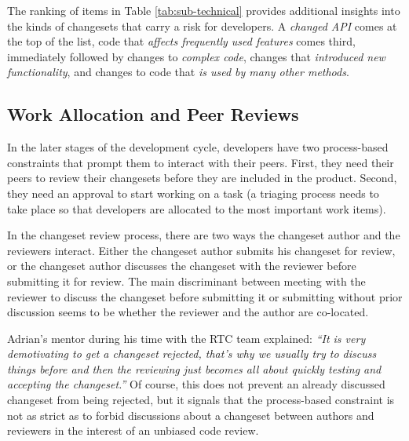 \documentclass[12pt,oneside]{book}
\begin{document}
The ranking of items in Table \ref{tab:sub-technical} provides additional insights into the kinds of changesets that carry a risk for developers. A \emph{changed API} comes at the top of the list, code that \emph{affects frequently used features} comes third, immediately followed by changes to \emph{complex code}, changes that \emph{introduced new functionality}, and changes to code that \emph{is used by many other methods}.






\subsection{Work Allocation and Peer Reviews}

In the later stages of the development cycle, developers have two process-based constraints that prompt them to interact with their peers. First, they need their peers to review their changesets before they are included in the product. Second, they need an approval to start working on a task (a triaging process needs to take place so that developers are allocated to the most important work items).

In the changeset review process, there are two ways the changeset author and the reviewers interact.
Either the changeset author submits his changeset for review, or the changeset author discusses the changeset with the reviewer before submitting it for review. The main discriminant between meeting with the reviewer to discuss the changeset before submitting it or submitting without prior discussion seems to be whether the reviewer and the author are co-located.

Adrian's mentor during his time with the RTC team explained: \emph{``It is very demotivating to get a changeset rejected, that's why we usually try to discuss things before and then the reviewing just becomes all about quickly testing and accepting the changeset.''} Of course, this does not prevent an already discussed changeset from being rejected, but it signals that the process-based constraint is not as strict as to forbid discussions about a changeset between authors and reviewers in the interest of an unbiased code review.
\end{document}
